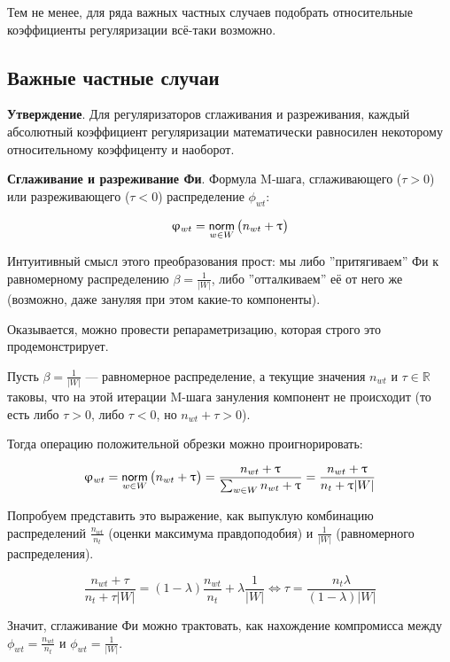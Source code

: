 Тем не менее, для ряда важных частных случаев подобрать относительные коэффициенты регуляризации всё-таки возможно.

\subsection{Важные частные случаи}

\textbf{Утверждение}. Для регуляризаторов сглаживания и разреживания, каждый абсолютный коэффициент регуляризации математически равносилен некоторому относительному коэффиценту и наоборот.

\textbf{Сглаживание и разреживание Фи}. Формула M-шага, сглаживающего ($\tau > 0$) или разреживающего ($\tau < 0$) распределение $\phi_{wt}$:

\[
\upvarphi_{wt} = \mathop{\mathsf{norm}}\limits_{w \in W} \big( n_{wt} + \uptau \big)
\]

Интуитивный смысл этого преобразования прост: мы либо ''притягиваем'' Фи к равномерному распределению $\beta = \frac{1}{|W|}$, либо ''отталкиваем'' её от него же (возможно, даже зануляя при этом какие-то компоненты).

Оказывается, можно провести репараметризацию, которая строго это продемонстрирует. 

Пусть $\beta = \frac{1}{|W|}$ --- равномерное распределение, а текущие значения $n_{wt}$ и $\tau \in \mathbb{R}$ таковы, что на этой итерации M-шага зануления компонент не происходит (то есть либо $\tau > 0$, либо $\tau < 0$, но $n_{wt} + \tau > 0$).

Тогда операцию положительной обрезки можно проигнорировать:

\[
\upvarphi_{wt} = \mathop{\mathsf{norm}}\limits_{w \in W} \big( n_{wt} + \uptau \big) = \frac{n_{wt} + \uptau }{\sum_{w \in W} n_{wt} + \uptau } = \frac{n_{wt} + \uptau }{n_{t} + \uptau |W|}  
\]

Попробуем представить это выражение, как выпуклую комбинацию распределений  $\frac{n_{wt}}{n_t}$ (оценки максимума правдоподобия) и $\frac{1}{|W|}$ (равномерного распределения). 


\[
\frac{n_{wt} + \tau}{n_{t} + \tau |W|} = (1-\lambda) \frac{n_{wt}}{n_t} + \lambda \frac{1}{|W|} \iff \tau  = \frac{n_t \lambda}{(1-\lambda) |W|} \label{sp_phi_rel2abs} 
\]

Значит, сглаживание Фи можно трактовать, как нахождение компромисса между $\phi_{wt} = \frac{n_{wt}}{n_t}$ и $\phi_{wt} = \frac{1}{|W|}$. 

